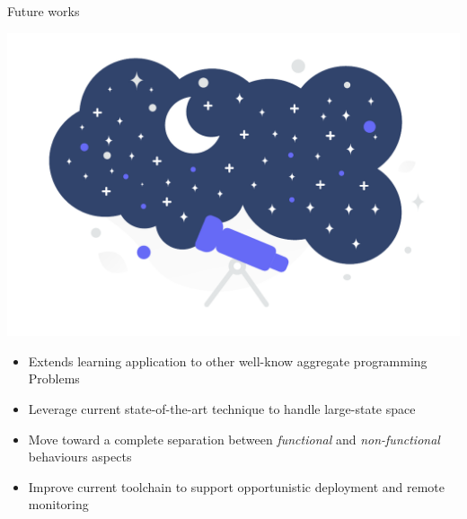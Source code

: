 \begin{frame}{Future works}
  \begin{backgroundblock} 
    \includegraphics[width=\paperwidth]{img/conclusion} 
  \end{backgroundblock} 
  \begin{card}
    \begin{itemize}
      \item Extends learning application to other well-know aggregate programming Problems
      \item Leverage current state-of-the-art technique to handle large-state space
    \end{itemize}
  \end{card}
  \begin{card}
    \begin{itemize}
      \item Move toward a complete separation between \textit{functional} and \textit{non-functional} behaviours aspects
      \item Improve current toolchain to support opportunistic deployment and remote monitoring
    \end{itemize}
  \end{card}

\end{frame}